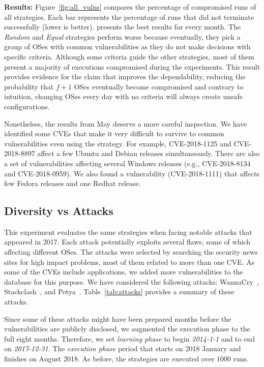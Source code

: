 \textbf{Results:} Figure~\ref{fig:all_vulns} compares the percentage of compromised runs of all strategies. 
Each bar represents the percentage of runs that did not terminate successfully (lower is better). 
\system presents the best results for every month.
The \emph{Random} and \emph{Equal} strategies perform worse because eventually, they pick a group of OSes with common vulnerabilities as they do not make decisions with specific criteria. 
Although some criteria guide the other strategies, most of them present a majority of executions compromised during the experiments.
This result provides evidence for the claim that \system improves the dependability, reducing the probability that $f+1$ OSes eventually become compromised and contrary to intuition, changing OSes every day with no criteria will always create unsafe configurations.


Nonetheless, the results from May deserve a more careful inspection. 
We have identified some CVEs that make it very difficult to survive to common vulnerabilities even using the \system strategy.
For example, CVE-2018-1125 and CVE-2018-8897 affect a few Ubuntu and Debian releases simultaneously.
There are also a set of vulnerabilities affecting several Windows releases (e.g., CVE-2018-8134 and CVE-2018-0959). 
We also found a vulnerability (CVE-2018-1111) that affects few Fedora releases and one Redhat release. 

\subsection{Diversity vs Attacks}


This experiment evaluates the same strategies when facing notable attacks that appeared in 2017. 
Each attack potentially exploits several flaws, some of which affecting different OSes. 
The attacks were selected by searching the security news sites for high impact problems, most of them related to more than one CVE. 
As some of the CVEs include applications, we added more vulnerabilities to the database for this purpose. 
We have considered the following attacks:
WannaCry~\cite{wannacry}, Stackclash~\cite{stacklash}, and Petya~\cite{petya}.
Table~\ref{tab:attacks} provides a summary of these attacks.



Since some of these attacks might have been prepared months before the vulnerabilities are publicly disclosed, we augmented the execution phase to the full eight months. 
Therefore, we set \emph{learning phase} to begin \emph{2014-1-1} and to end on \emph{2017-12-31}. 
The \emph{execution phase} period that starts on 2018 January and finishes on August 2018. 
As before, the strategies are executed over $1000$ runs. 



